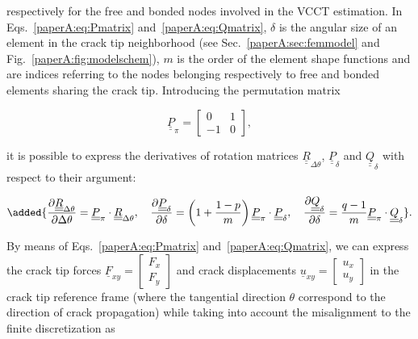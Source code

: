 respectively for the free and bonded nodes involved in the VCCT estimation. In Eqs.~\ref{paperA:eq:Pmatrix} and~\ref{paperA:eq:Qmatrix}, $\delta$ is the angular size of an element in the crack tip neighborhood (see Sec.~\ref{paperA:sec:femmodel} and Fig.~\ref{paperA:fig:modelschem}), $m$ is the order of the element shape functions and  are indices referring to the nodes belonging respectively to free and bonded elements sharing the crack tip.  Introducing the permutation matrix


\begin{equation}
\underline{\underline{P}}_{\pi}=\begin{bmatrix}
0 & 1\\
-1& 0
\end{bmatrix},
\end{equation}

it is possible to express the derivatives of rotation matrices $\underline{\underline{R}}_{\Delta\theta}$, $\underline{\underline{P}}_{\delta}$ and $\underline{\underline{Q}}_{\delta}$ with respect to their argument:

\begin{equation}\label{paperA:eq:rotmatdev}
\added{\frac{\partial \underline{\underline{R}}_{\Delta\theta}}{\partial \Delta\theta}=\underline{\underline{P}}_{\pi}\cdot\underline{\underline{R}}_{\Delta\theta},\quad\frac{\partial \underline{\underline{P}}_{\delta}}{\partial \delta}=\left(1+\frac{1-p}{m}\right)\underline{\underline{P}}_{\pi}\cdot\underline{\underline{P}}_{\delta},\quad\frac{\partial \underline{\underline{Q}}_{\delta}}{\partial \delta}=\frac{q-1}{m}\underline{\underline{P}}_{\pi}\cdot\underline{\underline{Q}}_{\delta}}.
\end{equation}

By means of Eqs.~\ref{paperA:eq:Pmatrix} and~\ref{paperA:eq:Qmatrix}, we can express the crack tip forces $
\underline{F}_{xy}=\begin{bmatrix}
F_{x} \\
F_{y}
\end{bmatrix}$ and crack displacements  $
\underline{u}_{xy}=\begin{bmatrix}
u_{x} \\
u_{y}
\end{bmatrix}$ in the crack tip reference frame (where the tangential direction $\theta$ correspond to the direction of crack propagation) while taking into account the misalignment to the finite  discretization as

